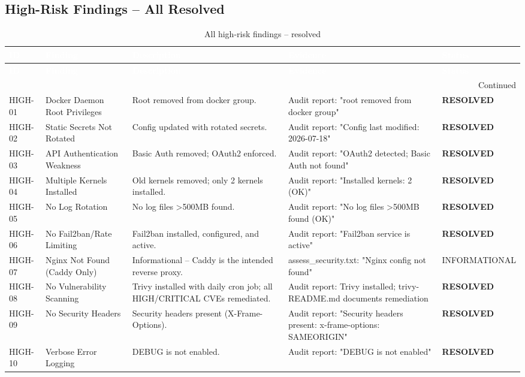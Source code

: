\subsection{High-Risk Findings – All Resolved}
\begin{center}
\begin{longtable}{|p{}|p{}|p{}|p{}|p{}|}
\caption[High-Risk Findings]{All high-risk findings – resolved}
\label{tab:high-findings} \\
\hline
\rowcolor{mooveblue}
\textcolor{white}{\textbf{ID}} & \textcolor{white}{\textbf{Finding}} & \textcolor{white}{\textbf{Description}} & \textcolor{white}{\textbf{Evidence}} & \textcolor{white}{\textbf{Status}} \\
\hline
\endfirsthead
\hline
\rowcolor{mooveblue}
\textcolor{white}{\textbf{ID}} & \textcolor{white}{\textbf{Finding}} & \textcolor{white}{\textbf{Description}} & \textcolor{white}{\textbf{Evidence}} & \textcolor{white}{\textbf{Status}} \\
\hline
\endhead
\hline
\multicolumn{5}{|r|}{Continued} \\
\hline
\endfoot
\hline
\endlastfoot
HIGH-01 & Docker Daemon Root Privileges & Root removed from docker group. & Audit report: "root removed from docker group" & \textbf{RESOLVED} \\
HIGH-02 & Static Secrets Not Rotated & Config updated with rotated secrets. & Audit report: "Config last modified: 2026-07-18" & \textbf{RESOLVED} \\
HIGH-03 & API Authentication Weakness & Basic Auth removed; OAuth2 enforced. & Audit report: "OAuth2 detected; Basic Auth not found" & \textbf{RESOLVED} \\
HIGH-04 & Multiple Kernels Installed & Old kernels removed; only 2 kernels installed. & Audit report: "Installed kernels: 2 (OK)" & \textbf{RESOLVED} \\
HIGH-05 & No Log Rotation & No log files >500MB found. & Audit report: "No log files >500MB found (OK)" & \textbf{RESOLVED} \\
HIGH-06 & No Fail2ban/Rate Limiting & Fail2ban installed, configured, and active. & Audit report: "Fail2ban service is active" & \textbf{RESOLVED} \\
HIGH-07 & Nginx Not Found (Caddy Only) & Informational – Caddy is the intended reverse proxy. & assess\_security.txt: "Nginx config not found" & INFORMATIONAL \\
HIGH-08 & No Vulnerability Scanning & Trivy installed with daily cron job; all HIGH/CRITICAL CVEs remediated. & Audit report: Trivy installed; trivy-README.md documents remediation & \textbf{RESOLVED} \\
HIGH-09 & No Security Headers & Security headers present (X-Frame-Options). & Audit report: "Security headers present: x-frame-options: SAMEORIGIN" & \textbf{RESOLVED} \\
HIGH-10 & Verbose Error Logging & DEBUG is not enabled. & Audit report: "DEBUG is not enabled" & \textbf{RESOLVED} \\
\hline
\end{longtable}
\end{center}

